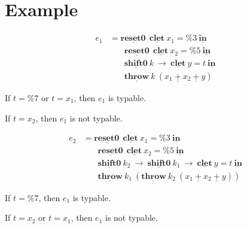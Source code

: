 \documentclass{jarticle}
\newcommand\cResetz{\underline{\textbf{reset0}}}
\newcommand\cShiftz{\underline{\textbf{shift0}}}
\newcommand\cThrow{\underline{\textbf{throw}}}
\newcommand\cPlus{\underline{\textbf{+}}}
\newcommand\cLet{\underline{\textbf{clet}}}
\newcommand\cIn{\underline{\textbf{in}}}
\newcommand\csp[1]{\texttt{\%}{#1}}
\begin{document}
\section{Example}

\begin{align*}
  e_1 & = \cResetz ~~\cLet~x_1=\csp{3}~\cIn \\
      & \phantom{=}~~ \cResetz ~~\cLet~x_2=\csp{5}~\cIn \\
      & \phantom{=}~~ \cShiftz~k~\to~\cLet~y=t~\cIn \\
      & \phantom{=}~~ \cThrow~k~(x_1~\cPlus~x_2~\cPlus~y)
\end{align*}

If $t=\csp{7}$ or $t=x_1$, then $e_1$ is typable.

If $t=x_2$, then $e_1$ is not typable.

\begin{align*}
  e_2 & = \cResetz ~~\cLet~x_1=\csp{3}~\cIn \\
      & \phantom{=}~~ \cResetz ~~\cLet~x_2=\csp{5}~\cIn \\
      & \phantom{=}~~ \cShiftz~k_2~\to~ \cShiftz~k_1~\to~ \cLet~y=t~\cIn \\
      & \phantom{=}~~ \cThrow~k_1~(\cThrow~k_2~(x_1~\cPlus~x_2~\cPlus~y))
\end{align*}

If $t=\csp{7}$, then $e_1$ is typable.

If $t=x_2$ or $t=x_1$, then $e_1$ is not typable.
\end{document}
